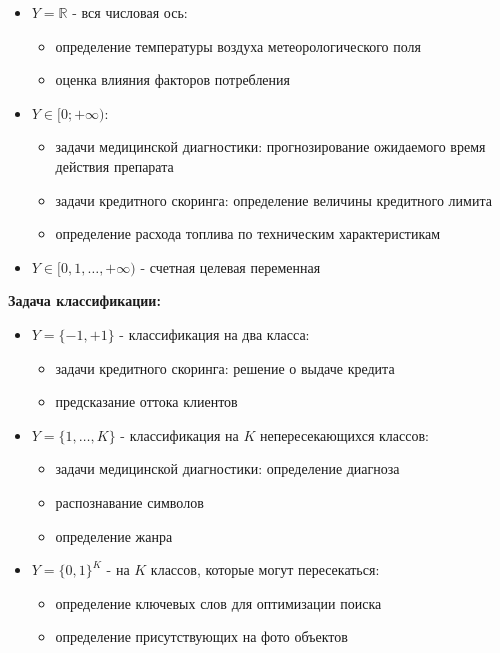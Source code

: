 \documentclass[aps,%
12pt,%
final,%
oneside,
onecolumn,%
musixtex, %
superscriptaddress,%
centertags]{article} %
\theoremstyle{plain}
\theoremstyle{definition}
\theoremstyle{remark}
\begin{document}
\begin{itemize}
	\item $Y = \mathbb{R}$ - вся числовая ось:
	\begin{itemize}
		\item определение температуры воздуха метеорологического поля
		\item оценка влияния факторов потребления
	\end{itemize}
	\item $Y \in [0;+\infty)$:
	\begin{itemize}
		\item задачи медицинской диагностики: прогнозирование ожидаемого время действия препарата
		\item задачи кредитного скоринга: определение величины кредитного лимита
		\item определение расхода топлива по техническим характеристикам
	\end{itemize}
	\item $Y \in [0,1,\ldots,+\infty)$ - счетная целевая переменная
\end{itemize}

\textbf{Задача классификации:}

\begin{itemize}
	\item $Y = \{-1,+1\}$ - классификация на два класса:
	\begin{itemize}
		\item задачи кредитного скоринга: решение о выдаче кредита
		\item предсказание оттока клиентов
	\end{itemize}

	\item $Y = \{1,\ldots,K\}$ - классификация на $K$ непересекающихся классов:
	\begin{itemize}
		\item задачи медицинской диагностики: определение диагноза
		\item распознавание символов
		\item определение жанра
	\end{itemize}

	\item $Y = \{0,1\}^K$ - на $K$ классов, которые могут пересекаться:
	\begin{itemize}
		\item определение ключевых слов для оптимизации поиска
		\item определение присутствующих на фото объектов
	\end{itemize}
\end{itemize}
\end{document}
